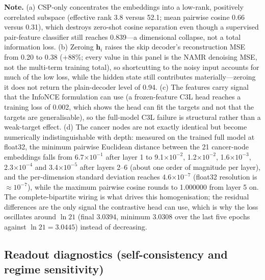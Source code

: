 \documentclass[11pt,a4paper]{article}
\begin{document}
\begin{table}[h]
\noindent \textbf{Note.} (a) CSP-only concentrates the embeddings into a low-rank, positively correlated subspace (effective
rank 3.8 versus 52.1; mean pairwise cosine 0.66 versus 0.31), which destroys zero-shot cosine separation even though a
supervised pair-feature classifier still reaches 0.839---a dimensional collapse, not a total information loss. (b) Zeroing
$\mathbf{h}_i$ raises the skip decoder's reconstruction MSE from 0.20 to 0.38 (+88\%; every value in this panel is the
NAMR denoising MSE, not the multi-term training total), so shortcutting to the noisy input accounts for much of the low
loss, while the hidden state still contributes materially---zeroing it does not return the plain-decoder level of 0.94. (c) The features carry signal that the InfoNCE formulation can use
(a frozen-feature C3L head reaches a training loss of 0.002, which shows the head can fit the targets and not that the
targets are generalisable), so the full-model C3L failure is structural rather than a weak-target effect. (d) The cancer
nodes are not exactly identical but become numerically indistinguishable with depth: measured on the trained full model at
float32, the minimum pairwise Euclidean distance between the 21 cancer-node embeddings falls from 6.7$\times10^{-1}$ after
layer 1 to 9.1$\times10^{-2}$, 1.2$\times10^{-2}$, 1.6$\times10^{-3}$, 2.3$\times10^{-4}$ and 3.4$\times10^{-5}$ after
layers 2--6 (about one order of magnitude per layer), and the per-dimension standard deviation reaches 4.6$\times10^{-7}$
(float32 resolution is $\approx10^{-7}$), while the maximum pairwise cosine rounds to 1.000000 from layer 5 on. The
complete-bipartite wiring is what drives this homogenisation; the residual differences are the only signal the contrastive
head can use, which is why the loss oscillates around $\ln 21$ (final 3.0394, minimum 3.0308 over the last five epochs
against $\ln 21=3.0445$) instead of decreasing.
\end{table}

\FloatBarrier


\subsection{Readout diagnostics (self-consistency and regime sensitivity)}
\end{document}
